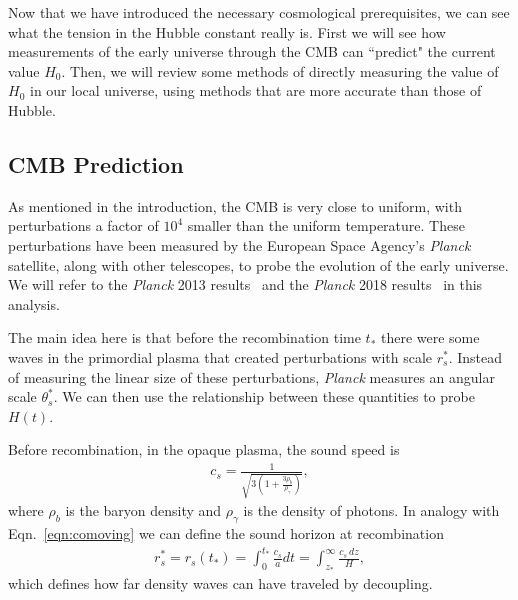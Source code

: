 \documentclass[12pt]{article}
\renewcommand{\l}{\ell}
\newcommand{\ex}[1]{\left\langle#1\right\rangle}
\renewcommand{\th}[1]{\frac{1}{#1}}
\newcommand{\Planck}[1]{\textit{Planck}}
\begin{document}
Now that we have introduced the necessary cosmological prerequisites, we can see what the tension in the Hubble constant really is. First we will see how measurements of the early universe through the CMB can ``predict" the current value $H_0$. Then, we will review some methods of directly measuring the value of $H_0$ in our local universe, using methods that are more accurate than those of Hubble.

\subsection{CMB Prediction} \label{sub:predic}

As mentioned in the introduction, the CMB is very close to uniform, with perturbations a factor of $10^4$ smaller than the uniform temperature. These perturbations have been measured by the European Space Agency's \Planck{} satellite, along with other telescopes,  to probe the evolution of the early universe. We will refer to the \Planck{} 2013 results~\cite{Planck2013} and the \Planck{} 2018 results~\cite{Planck2018} in this analysis. 

The main idea here is that before the recombination time $t_*$ there were some waves in the primordial plasma that created perturbations with scale $r_s^*$. Instead of measuring the linear size of these perturbations, \Planck{} measures an angular scale $\theta_s^*$. We can then use the relationship between these quantities to probe $H(t)$.

%

Before recombination, in the opaque plasma, the sound speed is 
\begin{align}
c_s = \th{\sqrt{3(1+\frac{3\rho_b}{\rho_\gamma})}},
\end{align}
where $\rho_b$ is the baryon density and $\rho_\gamma$ is the density of photons. In analogy with Eqn.~\ref{eqn:comoving} we can define the sound horizon at recombination~\cite{Planck2013}
\begin{align}
r_s^* =r_s(t_*) = \int_0^{t_*} \frac{c_s}{a} dt = \int_{z_*}^\infty \frac{c_s\, dz}{H}, \label{eqn:rs}
\end{align}
which defines how far density waves can have traveled by  decoupling. 
\end{document}

